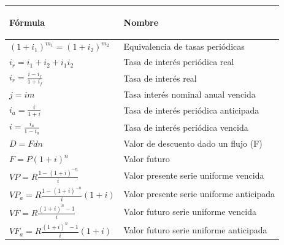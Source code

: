 \begin{spacing}{1}
\begin{center}
\begin{tabular}{ |p{7cm}|p{7cm}|}
\hline 
\rowcolor{orange!50}

\begin{center}\textbf{Fórmula} \end{center} & \begin{center} \textbf{Nombre} \end{center}  \\ \hline

$(1 + i_{1})^{m_1} = (1 + i_{2})^{m_2}$ & Equivalencia de tasas periódicas\\\hline 

$i_{r} = i_{1} + i_{2} + i_{1}i_{2}$ & Tasa de interés periódica real\\ \hline
$i_r = \frac{i - i_f}{1 + i_f}$ & Tasa de interés real\\ \hline 

$j = im$  &  Tasa interés nominal anual vencida\\ \hline   
 

$i_a = \frac{i}{1 + i}$  & Tasa de interés periódica anticipada\\ \hline   

 $i = \frac{i_a}{1 - i_a}$ & Tasa de interés periódica vencida\\ \hline   
$D = Fdn$ & Valor de descuento dado un flujo (F)\\ \hline
  
 $F = P(1 + i)^n$ & Valor futuro\\ \hline 

 $VP = R  \frac{1-(1 + i)^{-n}}{i} $ & Valor presente serie uniforme vencida\\ \hline 

$VP_{a} = R  \frac{1-(1 + i)^{-n}}{i}  (1 + i) $ & Valor presente serie uniforme anticipada\\ \hline 

$VF = R  \frac{(1 + i)^n-1}{i} $ & Valor futuro serie uniforme vencida\\ \hline   
$VF_{a} = R  \frac{(1 + i)^n-1}{i}(1 + i) $ & Valor futuro serie uniforme anticipada\\ \hline 


\end{tabular}
\end{center}
\end{spacing}
